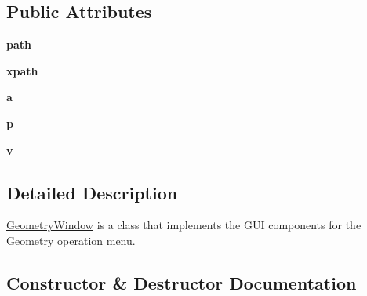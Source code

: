 \subsection*{Public Attributes}
\begin{DoxyCompactItemize}
\item 
\mbox{\label{classgeometry__ui_1_1_geometry_window_a8babe312d482e206b2dc7250ce38badf}} 
{\bfseries path}
\item 
\mbox{\label{classgeometry__ui_1_1_geometry_window_a152d50bcffbc41d48e48e5f4bc2a0b61}} 
{\bfseries xpath}
\item 
\mbox{\label{classgeometry__ui_1_1_geometry_window_abe95fb2e2e9934f76bf9c22f5b95f057}} 
{\bfseries a}
\item 
\mbox{\label{classgeometry__ui_1_1_geometry_window_a83ef83274a5147d430b345e3e165da24}} 
{\bfseries p}
\item 
\mbox{\label{classgeometry__ui_1_1_geometry_window_a6cf11c20a79daeba227001599c5e841f}} 
{\bfseries v}
\end{DoxyCompactItemize}


\subsection{Detailed Description}
\hyperlink{classgeometry__ui_1_1_geometry_window}{Geometry\+Window} is a class that implements the G\+UI components for the Geometry operation menu. 

\subsection{Constructor \& Destructor Documentation}
\mbox{\label{classgeometry__ui_1_1_geometry_window_af619e3ecabaa9592f6de5987e31a27d3}} 
